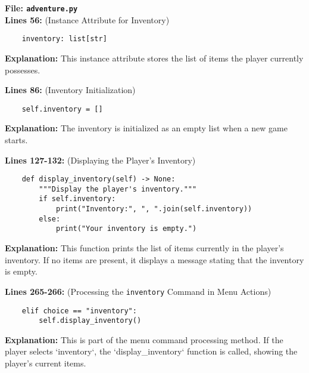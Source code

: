 \documentclass[11pt]{article}
\begin{document}
\textbf{File: \texttt{adventure.py}}\\

\noindent\textbf{Lines 56:} (Instance Attribute for Inventory)
\begin{verbatim}
    inventory: list[str]
\end{verbatim}
\textbf{Explanation:} This instance attribute stores the list of items the player currently possesses.

\noindent\textbf{Lines 86:} (Inventory Initialization)
\begin{verbatim}
    self.inventory = []
\end{verbatim}
\textbf{Explanation:} The inventory is initialized as an empty list when a new game starts.

\noindent\textbf{Lines 127-132:} (Displaying the Player's Inventory)
\begin{verbatim}
    def display_inventory(self) -> None:
        """Display the player's inventory."""
        if self.inventory:
            print("Inventory:", ", ".join(self.inventory))
        else:
            print("Your inventory is empty.")
\end{verbatim}
\textbf{Explanation:} This function prints the list of items currently in the player's inventory. If no items are
present, it displays a message stating that the inventory is empty.

\noindent\textbf{Lines 265-266:} (Processing the \texttt{inventory} Command in Menu Actions)
\begin{verbatim}
    elif choice == "inventory":
        self.display_inventory()
\end{verbatim}
\textbf{Explanation:} This is part of the menu command processing method. If the player selects `inventory`, the
`display\_inventory` function is called, showing the player's current items.
\end{document}
